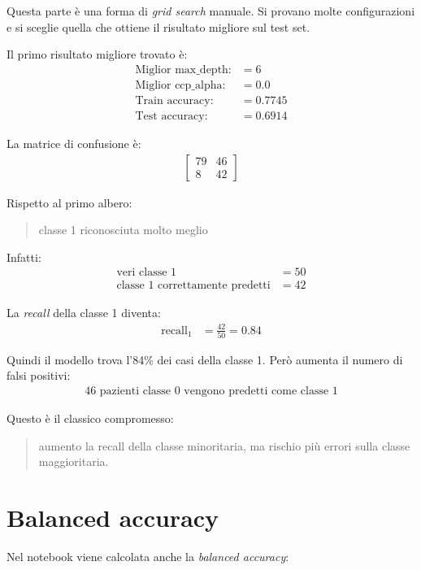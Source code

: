 \documentclass[11pt,a4paper]{article}
\begin{document}
Questa parte è una forma di \textit{grid search} manuale. Si provano molte configurazioni e si sceglie quella che ottiene il risultato migliore sul test set.

Il primo risultato migliore trovato è:
\begin{align*}
    \text{Miglior max\_depth:} &= 6 \\
    \text{Miglior ccp\_alpha:} &= 0.0 \\
    \text{Train accuracy:} &= 0.7745 \\
    \text{Test accuracy:} &= 0.6914
\end{align*}

La matrice di confusione è:
\begin{align*}
    \begin{bmatrix}
        79 & 46 \\
        8 & 42
    \end{bmatrix}
\end{align*}

Rispetto al primo albero:
\begin{quote}
    classe 1 riconosciuta molto meglio
\end{quote}

Infatti:
\begin{align*}
    \text{veri classe 1} &= 50 \\
    \text{classe 1 correttamente predetti} &= 42
\end{align*}

La \textit{recall} della classe 1 diventa:
\begin{align*}
    \text{recall}_1 &= \frac{42}{50} = 0.84
\end{align*}

Quindi il modello trova l'84\% dei casi della classe 1. Però aumenta il numero di falsi positivi:
\begin{align*}
    46 \text{ pazienti classe 0 vengono predetti come classe 1}
\end{align*}

Questo è il classico compromesso:
\begin{quote}
    aumento la recall della classe minoritaria, ma rischio più errori sulla classe maggioritaria.
\end{quote}

\section{Balanced accuracy}
Nel notebook viene calcolata anche la \textit{balanced accuracy}:
\end{document}
